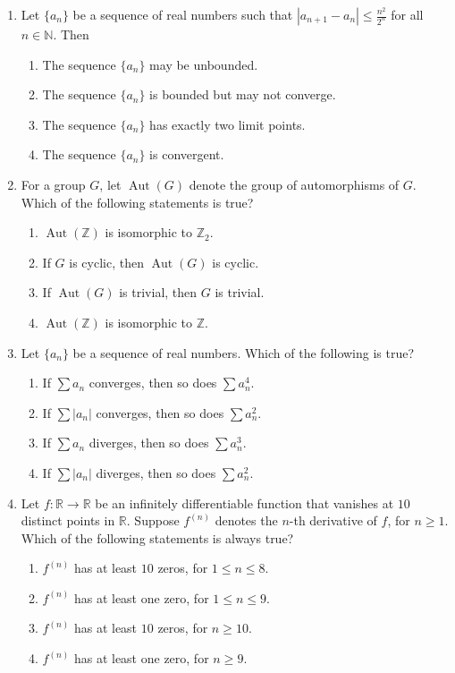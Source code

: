\documentclass[11pt, a4paper]{article}
\begin{document}
\begin{enumerate}
  \item Let $\{a_n\}$ be a sequence of real numbers such that $|a_{n+1} - a_n| \le \frac{n^2}{2^n}$ for all $n \in \mathbb{N}$. Then
  \begin{enumerate}[label=\Alph*.]
    \item The sequence $\{a_n\}$ may be unbounded.
    \item The sequence $\{a_n\}$ is bounded but may not converge.
    \item The sequence $\{a_n\}$ has exactly two limit points.
    \item The sequence $\{a_n\}$ is convergent.
  \end{enumerate}

  \item For a group $G$, let $\operatorname{Aut}(G)$ denote the group of automorphisms of $G$. Which of the following statements is true?
  \begin{enumerate}[label=\Alph*.]
    \item $\operatorname{Aut}(\mathbb{Z})$ is isomorphic to $\mathbb{Z}_2$.
    \item If $G$ is cyclic, then $\operatorname{Aut}(G)$ is cyclic.
    \item If $\operatorname{Aut}(G)$ is trivial, then $G$ is trivial.
    \item $\operatorname{Aut}(\mathbb{Z})$ is isomorphic to $\mathbb{Z}$.
  \end{enumerate}

  \item Let $\{a_n\}$ be a sequence of real numbers. Which of the following is true?
  \begin{enumerate}[label=\Alph*.]
    \item If $\sum a_n$ converges, then so does $\sum a_n^4$.
    \item If $\sum |a_n|$ converges, then so does $\sum a_n^2$.
    \item If $\sum a_n$ diverges, then so does $\sum a_n^3$.
    \item If $\sum |a_n|$ diverges, then so does $\sum a_n^2$.
  \end{enumerate}

  \item Let $f: \mathbb{R} \to \mathbb{R}$ be an infinitely differentiable function that vanishes at $10$ distinct points in $\mathbb{R}$. Suppose $f^{(n)}$ denotes the $n$-th derivative of $f$, for $n \ge 1$. Which of the following statements is always true?
  \begin{enumerate}[label=\Alph*.]
    \item $f^{(n)}$ has at least $10$ zeros, for $1 \le n \le 8$.
    \item $f^{(n)}$ has at least one zero, for $1 \le n \le 9$.
    \item $f^{(n)}$ has at least $10$ zeros, for $n \ge 10$.
    \item $f^{(n)}$ has at least one zero, for $n \ge 9$.
  \end{enumerate}


\end{enumerate}
\end{document}
